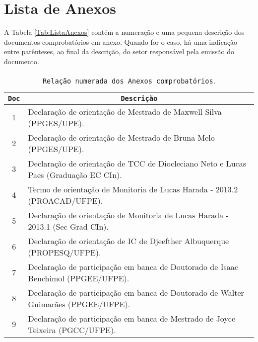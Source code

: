 \documentclass[a4paper,oneside,10pt]{article}
\newcommand{\otoprule}{\midrule[\heavyrulewidth]}
\newcounter{document}%
\begin{document}


\newpage
\section{Lista de Anexos}

A Tabela \ref{Tab:ListaAnexos} cont\'{e}m a numera\c{c}\~{a}o e uma pequena descri\c{c}\~{a}o dos documentos comprobat\'{o}rios em anexo. Quando for o caso, h\'{a} uma indica\c{c}\~{a}o entre par\^{e}nteses, ao final da descri\c{c}\~{a}o, do setor respons\'{a}vel pela emiss\~{a}o do documento.


\begin{table}[h]
\small
\caption{\texttt{Rela\c{c}\~{a}o numerada dos Anexos comprobat\'{o}rios}.}
\begin{tabular}{cl}
\toprule
\large{\textbf{\texttt{Doc}}} & \multicolumn{1}{c}{\large{\textbf{\texttt{Descri\c{c}\~{a}o}}}} \\
\otoprule
  1 & Declara\c{c}\~{a}o de orienta\c{c}\~{a}o de Mestrado de Maxwell Silva (PPGES/UPE). \\
  2 & Declara\c{c}\~{a}o de orienta\c{c}\~{a}o de Mestrado de Bruna Melo (PPGES/UPE). \\
  3 & Declara\c{c}\~{a}o de orienta\c{c}\~{a}o de TCC de Diocleciano Neto e Lucas Paes (Gradua\c{c}\~{a}o EC CIn). \\
  4 & Termo de orienta\c{c}\~{a}o de Monitoria de Lucas Harada - 2013.2 (PROACAD/UFPE). \\
  5 & Declara\c{c}\~{a}o de orienta\c{c}\~{a}o de Monitoria de Lucas Harada - 2013.1 (Sec Grad CIn). \\
  6 & Declara\c{c}\~{a}o de orienta\c{c}\~{a}o de IC de Djeefther Albuquerque (PROPESQ/UFPE). \\
  7 & Declara\c{c}\~{a}o de participa\c{c}\~{a}o em banca de Doutorado de Isaac Benchimol (PPGEE/UFPE). \\
  8 & Declara\c{c}\~{a}o de participa\c{c}\~{a}o em banca de Doutorado de Walter Guimar\~{a}es (PPGEE/UFPE). \\
  \cmidrule{1-2}
  9 & Declara\c{c}\~{a}o de participa\c{c}\~{a}o em banca de Mestrado de Joyce Teixeira (PGCC/UFPE). \\

\end{tabular}
\end{table}
\end{document}
